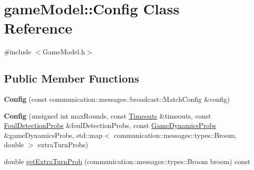 \hypertarget{classgame_model_1_1_config}{\section{game\-Model\-:\-:Config Class Reference}
\label{classgame_model_1_1_config}
}


{\ttfamily \#include $<$Game\-Model.\-h$>$}

\subsection*{Public Member Functions}
\begin{DoxyCompactItemize}
\item 
\hypertarget{classgame_model_1_1_config_ad52aaf53a06d21ebedd5328f4190b8c1}{{\bfseries Config} (const communication\-::messages\-::broadcast\-::\-Match\-Config \&config)}\label{classgame_model_1_1_config_ad52aaf53a06d21ebedd5328f4190b8c1}

\item 
\hypertarget{classgame_model_1_1_config_a74534bffc047f6038453997965f75199}{{\bfseries Config} (unsigned int max\-Rounds, const \hyperlink{structgame_model_1_1_timeouts}{Timeouts} \&timeouts, const \hyperlink{structgame_model_1_1_foul_detection_probs}{Foul\-Detection\-Probs} \&foul\-Detection\-Probs, const \hyperlink{structgame_model_1_1_game_dynamics_probs}{Game\-Dynamics\-Probs} \&game\-Dynamics\-Probs, std\-::map$<$ communication\-::messages\-::types\-::\-Broom, double $>$ extra\-Turn\-Probs)}\label{classgame_model_1_1_config_a74534bffc047f6038453997965f75199}

\item 
double \hyperlink{classgame_model_1_1_config_a7e2134a72f3b75c43610d337abf8e9c0}{get\-Extra\-Turn\-Prob} (communication\-::messages\-::types\-::\-Broom broom) const 
\end{DoxyCompactItemize}
